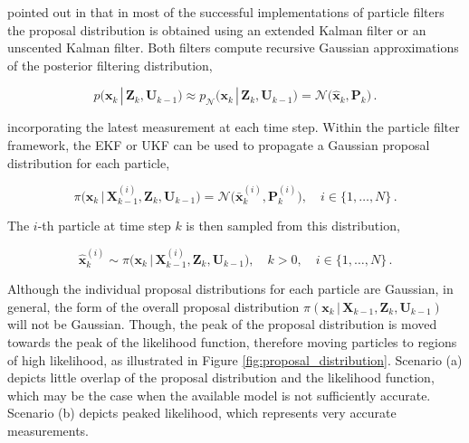 \noindent
\citeauthor{daum2005nonlinear} pointed out in \cite{daum2005nonlinear} that in most of the successful implementations of particle filters the proposal distribution is obtained using an extended Kalman filter or an unscented Kalman filter. Both filters compute recursive Gaussian approximations of the posterior filtering distribution,

\begin{equation}
  p\big(\bm{x}_k\,|\,\bm{Z}_{k}, \bm{U}_{k-1}\big) \approx p_{\mathcal{N}}\big(\bm{x}_k\,|\,\bm{Z}_{k}, \bm{U}_{k-1}\big) = \mathcal{N}\big(\hat{\bm{x}}_{k},\bm{P}_k\big)\,.
\end{equation}

\noindent
 incorporating the latest measurement at each time step. Within the particle filter framework, the EKF or UKF can be used to propagate a Gaussian proposal distribution for each particle, 

\begin{equation}
  \pi\big(\bm{x}_{k}\,|\,\bm{X}^{(i)}_{k-1}, \bm{Z}_{k}, \bm{U}_{k-1}\big) = \mathcal{N}\big(\bar{\bm{x}}^{(i)}_k,\bm{P}^{(i)}_k\big), \quad i \in \{1, \dots, N\}\,.
\end{equation}

\noindent
The $i$-th particle at time step $k$ is then sampled from this distribution,

\begin{equation}\label{eq:sample_proposal}
  \hat{\bm{x}}^{(i)}_k \sim \pi\big(\bm{x}_k\,|\,\bm{X}^{(i)}_{k-1}, \bm{Z}_{k}, \bm{U}_{k-1}\big), \quad k > 0,  \quad i \in \{1, \dots, N\}\,.
\end{equation}


Although the individual proposal distributions for each particle are Gaussian, in general, the form of the overall proposal distribution $\pi(\bm{x}_{k}\,|\,\bm{X}_{k-1}, \bm{Z}_{k}, \bm{U}_{k-1})$ will not be Gaussian. Though, the peak of the proposal distribution is moved towards the peak of the likelihood function, therefore moving particles to regions of high likelihood, as illustrated in Figure \ref{fig:proposal_distribution}. Scenario (a) depicts little overlap of the proposal distribution and the likelihood function, which may be the case when the available model is not sufficiently accurate. Scenario (b) depicts peaked likelihood, which represents very accurate measurements.

